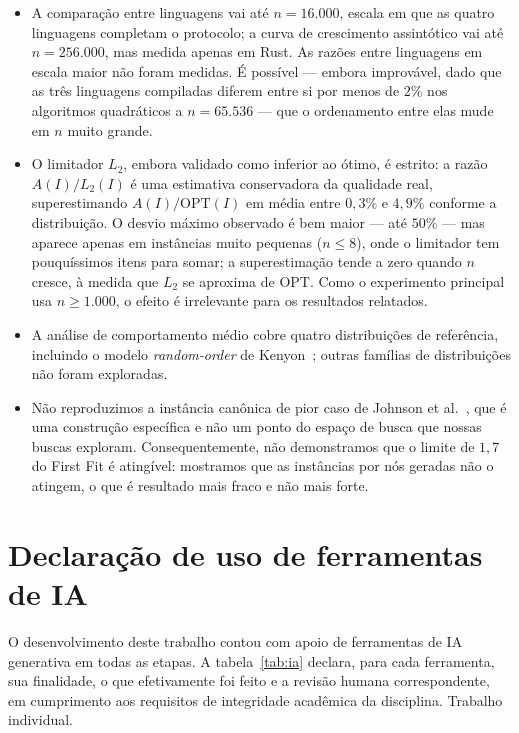 \documentclass[12pt]{article}
\begin{document}
\begin{itemize}[nosep]
  \item A comparação entre linguagens vai até $n = 16.000$, escala em que as quatro linguagens completam o protocolo; a curva de crescimento assintótico vai até $n = 256.000$, mas medida apenas em Rust. As razões entre linguagens em escala maior não foram medidas. É possível --- embora improvável, dado que as três linguagens compiladas diferem entre si por menos de $2\%$ nos algoritmos quadráticos a $n = 65.536$ --- que o ordenamento entre elas mude em $n$ muito grande.
  \item O limitador $L_2$, embora validado como inferior ao ótimo, é estrito: a razão $A(I)/L_2(I)$ é uma estimativa conservadora da qualidade real, superestimando $A(I)/\mathrm{OPT}(I)$ em média entre $0{,}3\%$ e $4{,}9\%$ conforme a distribuição. O desvio máximo observado é bem maior --- até $50\%$ --- mas aparece apenas em instâncias muito pequenas ($n \leq 8$), onde o limitador tem pouquíssimos itens para somar; a superestimação tende a zero quando $n$ cresce, à medida que $L_2$ se aproxima de $\mathrm{OPT}$. Como o experimento principal usa $n \geq 1.000$, o efeito é irrelevante para os resultados relatados.
  \item A análise de comportamento médio cobre quatro distribuições de referência, incluindo o modelo \textit{random-order} de Kenyon~\cite{kenyon1996}; outras famílias de distribuições não foram exploradas.
  \item Não reproduzimos a instância canônica de pior caso de Johnson et al.~\cite{johnson1974}, que é uma construção específica e não um ponto do espaço de busca que nossas buscas exploram. Consequentemente, não demonstramos que o limite de $1{,}7$ do First Fit é atingível: mostramos que as instâncias por nós geradas não o atingem, o que é resultado mais fraco e não mais forte.
\end{itemize}

\section{Declaração de uso de ferramentas de IA}

O desenvolvimento deste trabalho contou com apoio de ferramentas de IA generativa em todas as etapas. A tabela~\ref{tab:ia} declara, para cada ferramenta, sua finalidade, o que efetivamente foi feito e a revisão humana correspondente, em cumprimento aos requisitos de integridade acadêmica da disciplina. Trabalho individual.
\end{document}
